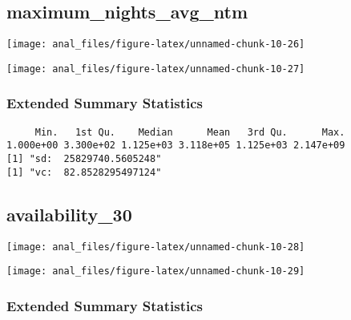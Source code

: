 \pagebreak

\centering

\hypertarget{maximum_nights_avg_ntm}{%
\subsection{maximum\_nights\_avg\_ntm}\label{maximum_nights_avg_ntm}}

\begin{center}\texttt{[image: anal\_files/figure-latex/unnamed-chunk-10-26]} \end{center}

\begin{center}\texttt{[image: anal\_files/figure-latex/unnamed-chunk-10-27]} \end{center}

\hypertarget{extended-summary-statistics-6}{%
\subsubsection{Extended Summary
Statistics}\label{extended-summary-statistics-6}}

\begin{verbatim}     Min.   1st Qu.    Median      Mean   3rd Qu.      Max. 
1.000e+00 3.300e+02 1.125e+03 3.118e+05 1.125e+03 2.147e+09 
[1] "sd:  25829740.5605248"
[1] "vc:  82.8528295497124"
\end{verbatim}

\pagebreak

\centering

\hypertarget{availability_30}{%
\subsection{availability\_30}\label{availability_30}}

\begin{center}\texttt{[image: anal\_files/figure-latex/unnamed-chunk-10-28]} \end{center}

\begin{center}\texttt{[image: anal\_files/figure-latex/unnamed-chunk-10-29]} \end{center}

\hypertarget{extended-summary-statistics-7}{%
\subsubsection{Extended Summary
Statistics}\label{extended-summary-statistics-7}}

